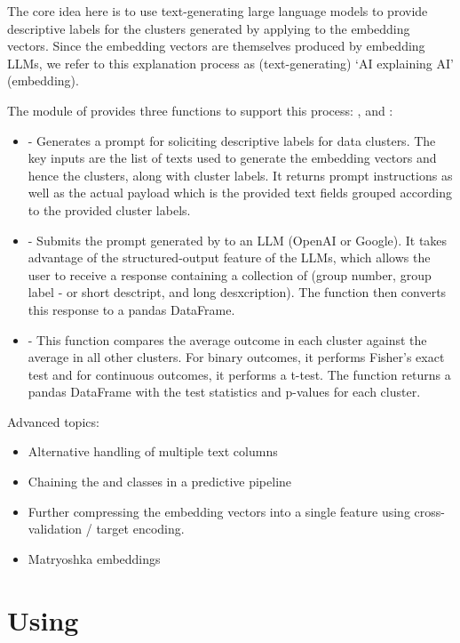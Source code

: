 \documentclass[article]{jss}
\begin{document}
The core idea here is to use text-generating large language models to provide descriptive labels for the clusters generated by applying  to the embedding vectors. Since the embedding vectors are themselves produced by embedding LLMs, we refer to this explanation process as (text-generating) `AI explaining AI' (embedding).

The  module of  provides three functions to support this process: ,  and :
\begin{itemize}
  \item \textbf{} - Generates a prompt for soliciting descriptive labels for data clusters. The key inputs are the list of texts used to generate the embedding vectors and hence the clusters, along with cluster labels. It returns prompt instructions as well as the actual payload which is the provided text fields grouped according to the provided cluster labels.
  \item \textbf{} - Submits the prompt generated by  to an LLM (OpenAI or Google). It takes advantage of the structured-output feature of the LLMs, which allows the user to receive a response containing a collection of (group number, group label - or short desctript, and long desxcription). The function then converts this response to a pandas DataFrame.
  \item \textbf{} - This function compares the average outcome in each cluster against the average in all other clusters. For binary outcomes, it performs Fisher's exact test and for continuous outcomes, it performs a t-test. The function returns a pandas DataFrame with the test statistics and p-values for each cluster.
\end{itemize}

Advanced topics:
\begin{itemize}
  \item Alternative handling of multiple text columns
  \item Chaining the  and  classes in a predictive pipeline
  \item Further compressing the embedding vectors into a single feature using cross-validation / target encoding.
  \item Matryoshka embeddings
\end{itemize}

\section[Using TabuLLM]{Using }\label{sec:usage}
\end{document}
